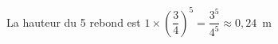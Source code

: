 
\medskip

% 
% 
La hauteur du 5 rebond est $1 \times \left(\dfrac{3}{4}\right)^5 = \dfrac{3^5}{4^5} \approx 0,24$~m
\bigskip


